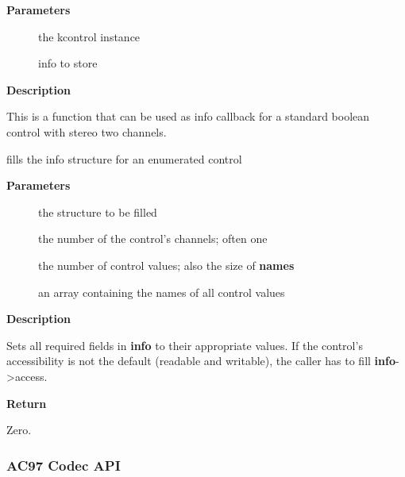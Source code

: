 \documentclass[a4paper,8pt,english]{sphinxmanual}
\begin{document}
\textbf{Parameters}
\begin{description}
\item[{}] \leavevmode
the kcontrol instance

\item[{}] \leavevmode
info to store

\end{description}

\textbf{Description}

This is a function that can be used as info callback for a standard
boolean control with stereo two channels.

\begin{fulllineitems}
\label{sound/kernel-api/alsa-driver-api:c.snd_ctl_enum_info}
fills the info structure for an enumerated control

\end{fulllineitems}


\textbf{Parameters}
\begin{description}
\item[{}] \leavevmode
the structure to be filled

\item[{}] \leavevmode
the number of the control's channels; often one

\item[{}] \leavevmode
the number of control values; also the size of \textbf{names}

\item[{}] \leavevmode
an array containing the names of all control values

\end{description}

\textbf{Description}

Sets all required fields in \textbf{info} to their appropriate values.
If the control's accessibility is not the default (readable and writable),
the caller has to fill \textbf{info}-\textgreater{}access.

\textbf{Return}

Zero.


\subsubsection{AC97 Codec API}
\label{sound/kernel-api/alsa-driver-api:ac97-codec-api}
\end{document}
